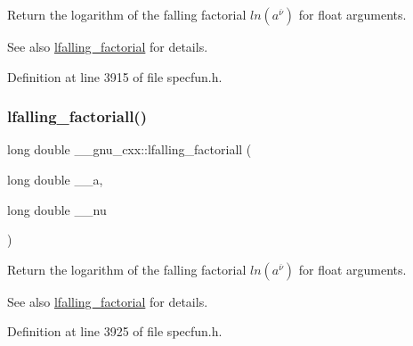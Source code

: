 Return the logarithm of the falling factorial $ ln(a^{\overline{\nu}})$ for float arguments.

\begin{DoxySeeAlso}{See also}
\hyperlink{group__gnu__math__spec__func_ga2032c10640d5010666d60d9faec86c32}{lfalling\+\_\+factorial} for details. 
\end{DoxySeeAlso}


Definition at line 3915 of file specfun.\+h.

\mbox{\label{group__gnu__math__spec__func_gaa69b6c70e000b073d7f0f17199b1feb0}} 
\subsubsection{\texorpdfstring{lfalling\+\_\+factoriall()}{lfalling\_factoriall()}}
{\footnotesize\ttfamily long double \+\_\+\+\_\+gnu\+\_\+cxx\+::lfalling\+\_\+factoriall (\begin{DoxyParamCaption}\item[{long double}]{\+\_\+\+\_\+a,  }\item[{long double}]{\+\_\+\+\_\+nu }\end{DoxyParamCaption})\hspace{0.3cm}{\ttfamily [inline]}}

Return the logarithm of the falling factorial $ ln(a^{\overline{\nu}})$ for float arguments.

\begin{DoxySeeAlso}{See also}
\hyperlink{group__gnu__math__spec__func_ga2032c10640d5010666d60d9faec86c32}{lfalling\+\_\+factorial} for details. 
\end{DoxySeeAlso}


Definition at line 3925 of file specfun.\+h.

\mbox{\label{group__gnu__math__spec__func_ga40fa5127f7c419ed1d8f1c6a6f96ea9b}} 
